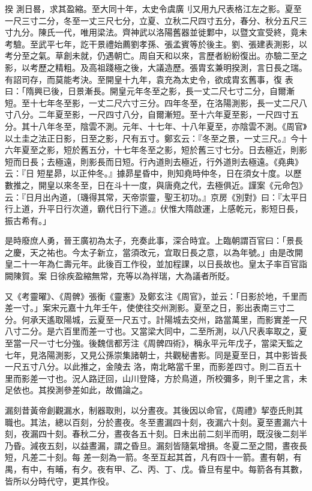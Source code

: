 \begin{pinyinscope}
 揆
 測日晷，求其盈縮。至大同十年，太史令虞廣刂又用九尺表格江左之影。夏至一尺三寸二分，冬至一丈三尺七分，立夏、立秋二尺四寸五分，春分、秋分五尺三寸九分。陳氏一代，唯用梁法。齊神武以洛陽舊器並徙鄴中，以暨文宣受終，竟未考驗。至武平七年，訖干景禮始薦劉孝孫、張孟賓等於後主。劉、張建表測影，以考分至之氣。草創未就，仍遇朝亡。周自天和以來，言歷者紛紛復出。亦驗二至之影，以考歷之精粗。及高祖踐極之後，大議造歷。張胄玄兼明揆測，言日長之瑞。有詔司存，而莫能考決。至開皇十九年，袁充為太史令，欲成胄玄舊事，復
 表曰：「隋興已後，日景漸長。開皇元年冬至之影，長一丈二尺七寸二分，自爾漸短。至十七年冬至影，一丈二尺六寸三分。四年冬至，在洛陽測影，長一丈二尺八寸八分。二年夏至影，一尺四寸八分，自爾漸短。至十六年夏至影，一尺四寸五分。其十八年冬至，陰雲不測。元年、十七年、十八年夏至，亦陰雲不測。《周官》以土圭之法正日影，日至之影，尺有五寸。鄭玄云：『冬至之景，一丈三尺。』今十六年夏至之影，短於舊五分，十七年冬至之影，短於舊三寸七分。日去極近，則影短而日長；去極遠，則影長而日短。行內道則去極近，行外道則去極遠。《堯典》云：『日
 短星昴，以正仲冬。』據昴星昏中，則知堯時仲冬，日在須女十度。以歷數推之，開皇以來冬至，日在斗十一度，與唐堯之代，去極俱近。謹案《元命包》云：『日月出內道，〔璣得其常，天帝崇靈，聖王初功。』京房《別對》曰：『太平日行上道，升平日行次道，霸代日行下道。』伏惟大隋啟運，上感乾元，影短日長，振古希有。」



 是時廢庶人勇，晉王廣初為太子，充奏此事，深合時宜。上臨朝謂百官曰：「景長之慶，天之祐也。今太子新立，當須改元，宜取日長之意，以為年號。」由是改開皇二十一年為仁壽元年。此後百工作役，並加程課，以日長故也。皇太子率百官詣闕陳賀。案
 日徐疾盈縮無常，充等以為祥瑞，大為議者所貶。



 又《考靈曜》、《周髀》張衡《靈憲》及鄭玄注《周官》，並云：「日影於地，千里而差一寸。」案宋元嘉十九年壬午，使使往交州測影。夏至之日，影出表南三寸二分。何承天遙取陽城，云夏至一尺五寸。計陽城去交州，路當萬里，而影實差一尺八寸二分。是六百里而差一寸也。又當梁大同中，二至所測，以八尺表率取之，夏至當一尺一寸七分強。後魏信都芳注《周髀四術》，稱永平元年戊子，當梁天監之七年，見洛陽測影，又見公孫崇集諸朝士，共觀秘書影。同是夏至日，其中影皆長一尺五寸八分。以此推之，金陵去
 洛，南北略當千里，而影差四寸。則二百五十里而影差一寸也。況人路迂回，山川登降，方於鳥道，所校彌多，則千里之言，未足依也。其揆測參差如此，故備論之。



 漏刻昔黃帝創觀漏水，制器取則，以分晝夜。其後因以命官，《周禮》挈壺氏則其職也。其法，總以百刻，分於晝夜。冬至晝漏四十刻，夜漏六十刻。夏至晝漏六十刻，夜漏四十刻。春秋二分，晝夜各五十刻。日未出前二刻半而明，既沒後二刻半乃昏。減夜五刻，以益晝漏，謂之昏旦。漏刻皆隨氣增損。冬夏二至之間，晝夜長短，凡差二十刻。每
 差一刻為一箭。冬至互起其首，凡有四十一箭。晝有朝，有禺，有中，有晡，有夕。夜有甲、乙、丙、丁、戊。昏旦有星中。每箭各有其數，皆所以分時代守，更其作役。




\end{pinyinscope}
